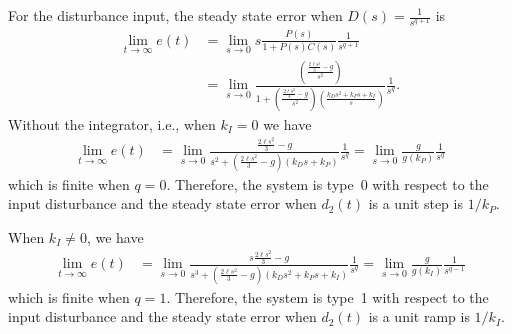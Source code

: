 For the disturbance input, the steady state error when $D(s) = \frac{1}{s^{q+1}}$ is
\begin{align*}
\lim_{t\to\infty}e(t) &= \lim_{s\to 0}s\frac{P(s)}{1+P(s)C(s)}\frac{1}{s^{q+1}} \\
&= \lim_{s\to 0} \frac{\left(\frac{\frac{2\ell s^2}{3}-g}{s^2}\right)}{1+\left(\frac{\frac{2\ell s^2}{3}-g}{s^2}\right)\left(\frac{k_Ds^2+k_Ps+k_I}{s}\right)}\frac{1}{s^q}.
\end{align*}
Without the integrator, i.e., when $k_I=0$ we have
\begin{align*}
\lim_{t\to\infty}e(t) &= \lim_{s\to 0} \frac{\frac{2\ell s^2}{3}-g}{s^2+\left(\frac{2\ell s^2}{3}-g\right)\left(k_Ds+k_P\right)}\frac{1}{s^q} 
= \lim_{s\to 0} \frac{g}{g\left(k_P\right)}\frac{1}{s^q}
\end{align*}
which is finite when $q=0$.  Therefore, the system is type~0 with respect to the input disturbance and the steady state error when $d_2(t)$ is a unit step is $1/k_P$.  

When $k_I\neq 0$, we have
\begin{align*}
\lim_{t\to\infty}e(t) &= \lim_{s\to 0} \frac{s\frac{2\ell s^2}{3}-g}{s^3+\left(\frac{2\ell s^2}{3}-g \right)\left(k_Ds^2+k_Ps+k_I\right)}\frac{1}{s^q} 
= \lim_{s\to 0} \frac{g}{g\left(k_I\right)}\frac{1}{s^{q-1}}
\end{align*}
which is finite when $q=1$.  Therefore, the system is type~1 with respect to the input disturbance and the steady state error when $d_2(t)$ is a unit ramp is $1/k_I$.  

